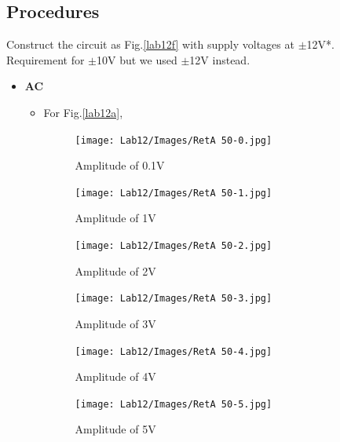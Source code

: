     \subsection{Procedures}
    Construct the circuit as Fig.\ref{lab12f} with supply voltages at $\pm$12V*.\\
    {\small *Requirement for $\pm$10V but we used $\pm$12V instead.}\\
        \begin{itemize}
            \item \textbf{AC}
                \begin{itemize}
                    \item For Fig.\ref{lab12a},\\
\begin{figure}[h]
    \centering
    \texttt{[image: Lab12/Images/RetA 50-0.jpg]}
    \caption{Amplitude of 0.1V}
    \label{l120wf1}
\end{figure}
\FloatBarrier
\begin{figure}[h]
    \centering
    \texttt{[image: Lab12/Images/RetA 50-1.jpg]}
    \caption{Amplitude of 1V}
    \label{l121wf1}
\end{figure}
\FloatBarrier
\begin{figure}[h]
    \centering
    \texttt{[image: Lab12/Images/RetA 50-2.jpg]}
    \caption{Amplitude of 2V}
    \label{l122wf1}
\end{figure}
\FloatBarrier
\begin{figure}[h]
    \centering
    \texttt{[image: Lab12/Images/RetA 50-3.jpg]}
    \caption{Amplitude of 3V}
    \label{l123wf1}
\end{figure}
\FloatBarrier
\begin{figure}[h]
    \centering
    \texttt{[image: Lab12/Images/RetA 50-4.jpg]}
    \caption{Amplitude of 4V}
    \label{l124wf1}
\end{figure}
\FloatBarrier
\begin{figure}[h]
    \centering
    \texttt{[image: Lab12/Images/RetA 50-5.jpg]}
    \caption{Amplitude of 5V}
    \label{l125wf1}
\end{figure}
\FloatBarrier


\end{itemize}
\end{itemize}
